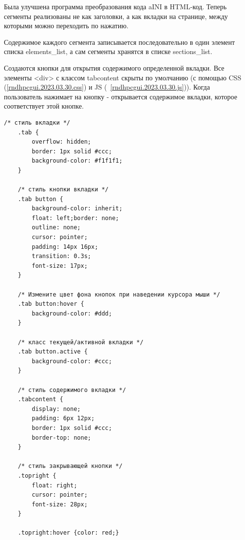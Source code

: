 \def\notedate{2023.03.30}
\def\currentauthor{Василян А.Р. (РК6-83Б)}

Была улучшена программа преобразования кода \textsf{aINI} в \textsf{HTML}-код. Теперь сегменты реализованы не как заголовки, а как вкладки на странице, между которыми  можно переходить по нажатию.

Содержимое каждого сегмента записывается последовательно в один элемент списка \textsf{elements_list}, а сам сегменты хранятся в списке \textsf{sections_list}.  

Создаются кнопки для открытия содержимого определенной вкладки. Все элементы \textsf{<div>} с классом \textsf{tabcontent} скрыты по умолчанию (с помощью \textsf{CSS} (\ref{rndhpcgui.2023.03.30.css}) и \textsf{JS} (~\ref{rndhpcgui.2023.03.30.js})). Когда пользователь нажимает на кнопку - открывается содержимое вкладки, которое соответствует этой кнопке.


\begin{lstlisting}[frame=single, label={rndhpcgui.2023.03.30.css}, caption={CSS стили}, language={HTML}] 
    /* стиль вкладки */
    .tab {
        overflow: hidden;
        border: 1px solid #ccc;
        background-color: #f1f1f1;
    }
    
    /* стиль кнопки вкладки */
    .tab button {
        background-color: inherit;
        float: left;border: none;
        outline: none;
        cursor: pointer;
        padding: 14px 16px;
        transition: 0.3s;
        font-size: 17px;
    }
    
    /* Измените цвет фона кнопок при наведении курсора мыши */
    .tab button:hover {
        background-color: #ddd;
    }
    
    /* класс текущей/активной вкладки */
    .tab button.active {
        background-color: #ccc;
    }
    
    /* стиль содержимого вкладки */
    .tabcontent {
        display: none;
        padding: 6px 12px;
        border: 1px solid #ccc;
        border-top: none;
    }
    
    /* стиль закрывающей кнопки */
    .topright {
        float: right;
        cursor: pointer;
        font-size: 28px;
    }
    
    .topright:hover {color: red;}
\end{lstlisting}


